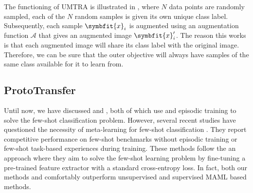 The functioning of UMTRA is illustrated in , where $N$ data points are randomly sampled, each of the $N$ random samples is given its own unique class label. Subsequently, each sample $\symbfit{x}_i$ is augmented using an augmentation function $\mathcal{A}$ that gives an augmented image $\symbfit{x}_i^\prime$. 
The reason this works is that each augmented image will share its class label with the original image. Therefore, we can be sure that the outer objective will always have samples of the same class available for it to learn from. 

\subsection{ProtoTransfer}\label{ssec:prototransfer}

Until now, we have discussed  and , both of which use  and episodic training to solve the few-shot classification problem.
However, several recent studies have questioned the necessity of meta-learning for few-shot classification \parencite{goodemballneed2020, Medina2020Self-SupervisedClassification, dhillon2019baseline, ziko2020laplacian, boudiaf2020information,chen2021self}.
They report competitive performance on few-shot benchmarks without episodic training or few-shot task-based experiences during training. These methods follow the an approach where they aim to solve the few-shot learning problem by fine-tuning a pre-trained feature extractor with a standard cross-entropy loss. In fact, both our methods \ccclr{} and \samptr{} comfortably outperform unsupervised and supervised MAML based methods.

